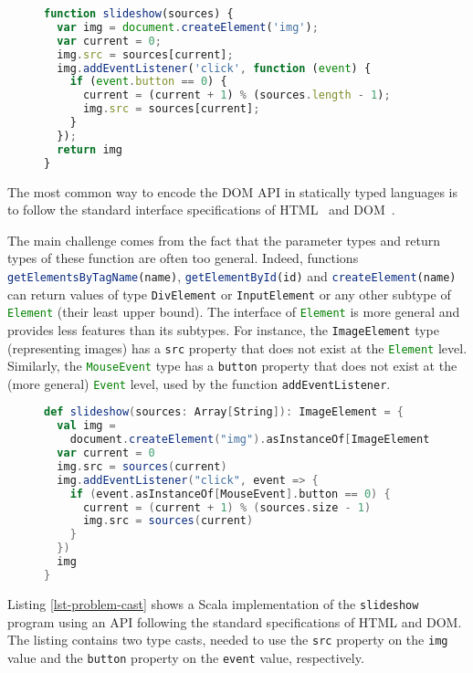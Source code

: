 \documentclass{llncs}
\newcommand{\jscode}[1]{\lstinline[language=JavaScript]|#1|}
\newcommand{\scalacode}[1]{\lstinline[language=Scala]|#1|}
\begin{document}
\begin{figure}
\begin{lstlisting}[label=lst-problem,language=JavaScript,caption=JavaScript function creating a slide show from an array of image URLs]
function slideshow(sources) {
  var img = document.createElement('img');
  var current = 0;
  img.src = sources[current];
  img.addEventListener('click', function (event) {
    if (event.button == 0) {
      current = (current + 1) % (sources.length - 1);
      img.src = sources[current];
    }
  });
  return img
}
\end{lstlisting}
\end{figure}

The most common way to encode the DOM API in statically typed languages is to follow the standard interface specifications of HTML~\cite{Raggett99_HTML} and DOM~\cite{w3c2004document}. 

The main challenge comes from the fact that the parameter types and return types of these function are often too general. Indeed, functions \jscode{getElementsByTagName(name)}, \jscode{getElementById(id)} and \jscode{createElement(name)} can return values of type \jscode{DivElement} or \jscode{InputElement} or any other subtype of \jscode{Element} (their least upper bound). The interface of \jscode{Element} is more general and provides less features than its subtypes. For instance, the \jscode{ImageElement} type (representing images) has a \jscode{src} property that does not exist at the \jscode{Element} level. Similarly, the \jscode{MouseEvent} type has a \jscode{button} property that does not exist at the (more general) \jscode{Event} level, used by the function \jscode{addEventListener}.

\begin{figure}
\begin{lstlisting}[label=lst-problem-cast,language=Scala,caption={Scala implementation of \texttt{slideshow} using the standard HTML and DOM API}]
def slideshow(sources: Array[String]): ImageElement = {
  val img =
    document.createElement("img").asInstanceOf[ImageElement]
  var current = 0
  img.src = sources(current)
  img.addEventListener("click", event => {
    if (event.asInstanceOf[MouseEvent].button == 0) {
      current = (current + 1) % (sources.size - 1)
      img.src = sources(current)
    }
  })
  img
}
\end{lstlisting}
\end{figure}

Listing \ref{lst-problem-cast} shows a Scala implementation of the \jscode{slideshow} program using an API following the standard specifications of HTML and DOM. The listing contains two type casts, needed to use the \scalacode{src} property on the \scalacode{img} value and the \scalacode{button} property on the \scalacode{event} value, respectively.
\end{document}
